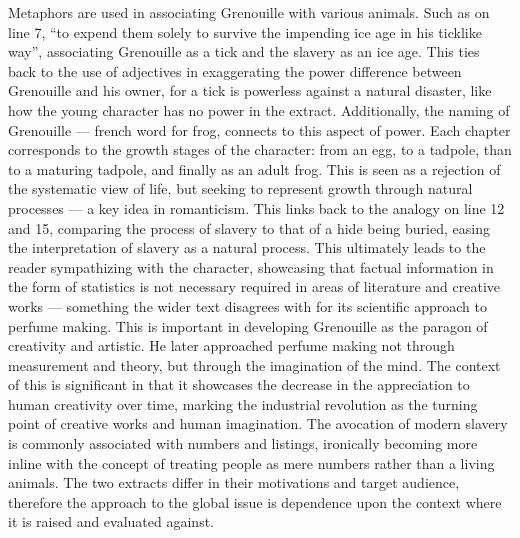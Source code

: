 \documentclass[a4paper,12pt]{article}
\begin{document}
Metaphors are used in associating Grenouille with various animals. Such as on line 7, ``to expend them solely to survive the impending ice age in his ticklike way'', associating Grenouille as a tick and the slavery as an ice age. This ties back to the use of adjectives in exaggerating the power difference between Grenouille and his owner, for a tick is powerless against a natural disaster, like how the young character has no power in the extract. Additionally, the naming of Grenouille --- french word for frog, connects to this aspect of power. Each chapter corresponds to the growth stages of the character: from an egg, to a tadpole, than to a maturing tadpole, and finally as an adult frog. This is seen as a rejection of the systematic view of life, but seeking to represent growth through natural processes --- a key idea in romanticism. This links back to the analogy on line 12 and 15, comparing the process of slavery to that of a hide being buried, easing the interpretation of slavery as a natural process. This ultimately leads to the reader sympathizing with the character, showcasing that factual information in the form of statistics is not necessary required in areas of literature and creative works --- something the wider text disagrees with for its scientific approach to perfume making.
This is important in developing Grenouille as the paragon of creativity and artistic. He later approached perfume making not through measurement and theory, but through the imagination of the mind. The context of this is significant in that it showcases the decrease in the appreciation to human creativity over time, marking the industrial revolution as the turning point of creative works and human imagination. The avocation of modern slavery is commonly associated with numbers and listings, ironically becoming more inline with the concept of treating people as mere numbers rather than a living animals.
The two extracts differ in their motivations and target audience, therefore the approach to the global issue is dependence upon the context where it is raised and evaluated against.
\end{document}

